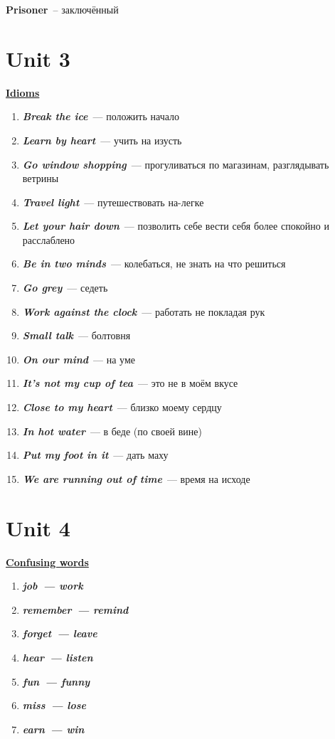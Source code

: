 \documentclass[10pt,a4paper]{article}
\begin{document}
\textbf{Prisoner}~-- заключённый





\section{Unit 3}
\textbf{\underline{Idioms}}

\begin{enumerate}
  \item \textit{\textbf{Break the ice}}~--- положить начало 
  \item \textit{\textbf{Learn by heart}}~--- учить на изусть
  \item \textit{\textbf{Go window shopping}}~--- прогуливаться по магазинам, разглядывать ветрины
  \item \textit{\textbf{Travel light}}~--- путешествовать на-легке
  \item \textit{\textbf{Let your hair down}}~--- позволить себе вести себя более спокойно и расслаблено
  \item \textit{\textbf{Be in two minds}}~--- колебаться, не знать на что решиться
  \item \textit{\textbf{Go grey}}~--- седеть
  \item \textit{\textbf{Work against the clock}}~--- работать не покладая рук
  \item \textit{\textbf{Small talk}}~--- болтовня
  \item \textit{\textbf{On our mind}}~--- на уме
  \item \textit{\textbf{It's not my cup of tea}}~--- это не в моём вкусе
  \item \textit{\textbf{Close to my heart}}~--- близко моему сердцу
  \item \textit{\textbf{In hot water}}~--- в беде (по своей вине)
  \item \textit{\textbf{Put my foot in it}}~--- дать маху
  \item \textit{\textbf{We are running out of time}}~--- время на исходе
\end{enumerate}

 
 


\section{Unit 4}

\textbf{\underline{Confusing words}}
\begin{enumerate}
  \item \textit{\textbf{job~--- work}}
  \item \textit{\textbf{remember~--- remind}}
  \item \textit{\textbf{forget~--- leave}}
  \item \textit{\textbf{hear~--- listen}}
  \item \textit{\textbf{fun~--- funny}}
  \item \textit{\textbf{miss~--- lose}}
  \item \textit{\textbf{earn~--- win}}
\end{enumerate}
\end{document}
